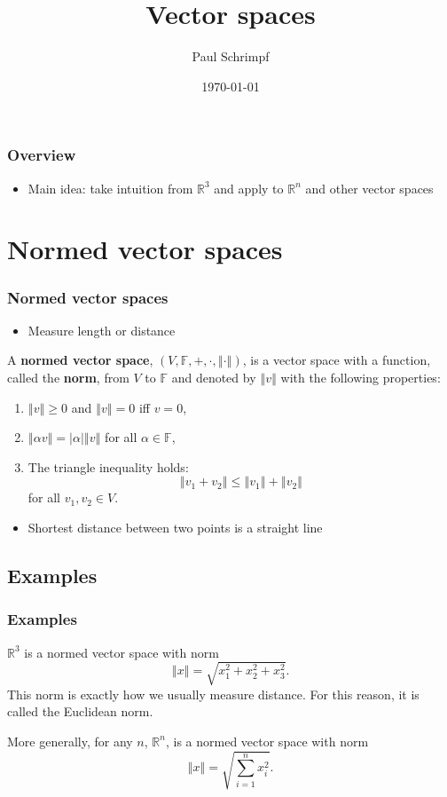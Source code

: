 \documentclass[compress]{beamer}
\title{Vector spaces}
\author{Paul Schrimpf}
\institute{UBC \\ Economics 526}
\date{\today}
\def\F{\mathbb{F}}
\def\R{\mathbb{R}}
\newcommand{\norm}[1]{\left\Vert {#1} \right\Vert}
\begin{document}
\frame{\titlepage}
\setcounter{tocdepth}{2}

\begin{frame}
  \frametitle{Overview}
  \begin{itemize} 
  \item Main idea: take intuition from $\R^3$ and apply to $\R^n$ and
    other vector spaces
  \end{itemize}
\end{frame}

\begin{frame}
  \tableofcontents  
\end{frame}

\section{Normed vector spaces}
\begin{frame}
  \frametitle{Normed vector spaces}
  \begin{itemize}
  \item Measure length or distance
  \end{itemize}
  \begin{definition}
    A \textbf{normed vector space}, $(V,\F,+,\cdot, \norm{\cdot})$, is a
    vector space with a function, called the \textbf{norm}, from $V$ to
    $\F$ and denoted by $\norm{v}$ with the following properties:
    \begin{enumerate}
    \item $\norm{v} \geq 0$ and $\norm{v} = 0$ iff $v = 0$,
    \item $\norm{\alpha v} = |\alpha|\norm{v}$ for all $\alpha \in \F$,
    \item The triangle inequality holds:
      \[ \norm{v_1+v_2} \leq \norm{v_1} + \norm{v_2} \]
      for all $v_1, v_2 \in V$.
    \end{enumerate}
  \end{definition}
  \begin{itemize}
  \item Shortest distance between two points is a straight line
  \end{itemize}
\end{frame}

\subsection{Examples}
\begin{frame}
  \frametitle{Examples}
  \begin{example}
    $\R^3$ is a normed vector space with norm
    \[ \norm{x} = \sqrt{x_1^2 + x_2^2 + x_3^2}. \] 
    This norm is exactly
    how we usually measure distance. For this reason, it is called the
    Euclidean norm.
    
    More generally, for any $n$, $\R^n$, is a normed vector space with
    norm 
    \[ \norm{x} = \sqrt{\sum_{i=1}^n x_i^2 }. \]
  \end{example}
\end{frame}
\end{document}
